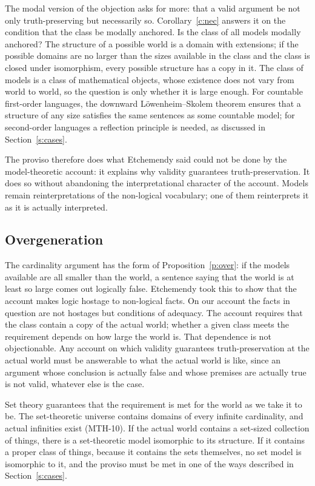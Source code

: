 \documentclass{situationist-preprint}
\begin{document}
The modal version of the objection asks for more: that a valid argument be not only truth-preserving but necessarily so. Corollary~\ref{c:nec} answers it on the condition that the class be modally anchored. Is the class of all models modally anchored? The structure of a possible world is a domain with extensions; if the possible domains are no larger than the sizes available in the class and the class is closed under isomorphism, every possible structure has a copy in it. The class of models is a class of mathematical objects, whose existence does not vary from world to world, so the question is only whether it is large enough. For countable first-order languages, the downward L\"owenheim--Skolem theorem ensures that a structure of any size satisfies the same sentences as some countable model; for second-order languages a reflection principle is needed, as discussed in Section~\ref{s:cases}.

The proviso therefore does what Etchemendy said could not be done by the model-theoretic account: it explains why validity guarantees truth-preservation. It does so without abandoning the interpretational character of the account. Models remain reinterpretations of the non-logical vocabulary; one of them reinterprets it as it is actually interpreted.

\subsection{Overgeneration}

The cardinality argument has the form of Proposition~\ref{p:over}: if the models available are all smaller than the world, a sentence saying that the world is at least so large comes out logically false. Etchemendy took this to show that the account makes logic hostage to non-logical facts. On our account the facts in question are not hostages but conditions of adequacy. The account requires that the class contain a copy of the actual world; whether a given class meets the requirement depends on how large the world is. That dependence is not objectionable. Any account on which validity guarantees truth-preservation at the actual world must be answerable to what the actual world is like, since an argument whose conclusion is actually false and whose premises are actually true is not valid, whatever else is the case.

Set theory guarantees that the requirement is met for the world as we take it to be. The set-theoretic universe contains domains of every infinite cardinality, and actual infinities exist (MTH-10). If the actual world contains a set-sized collection of things, there is a set-theoretic model isomorphic to its structure. If it contains a proper class of things, because it contains the sets themselves, no set model is isomorphic to it, and the proviso must be met in one of the ways described in Section~\ref{s:cases}.
\end{document}
